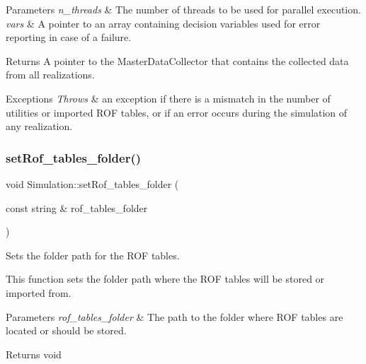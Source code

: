 \begin{DoxyParams}{Parameters}
{\em n\+\_\+threads} & The number of threads to be used for parallel execution. \\
\hline
{\em vars} & A pointer to an array containing decision variables used for error reporting in case of a failure.\\
\hline
\end{DoxyParams}
\begin{DoxyReturn}{Returns}
A pointer to the {\ttfamily Master\+Data\+Collector} that contains the collected data from all realizations.
\end{DoxyReturn}

\begin{DoxyExceptions}{Exceptions}
{\em Throws} & an exception if there is a mismatch in the number of utilities or imported R\+OF tables, or if an error occurs during the simulation of any realization. \\
\hline
\end{DoxyExceptions}
\mbox{\label{classSimulation_a0f01e328435fab79c18ccdda28617bae}} 
\subsubsection{\texorpdfstring{set\+Rof\+\_\+tables\+\_\+folder()}{setRof\_tables\_folder()}}
{\footnotesize\ttfamily void Simulation\+::set\+Rof\+\_\+tables\+\_\+folder (\begin{DoxyParamCaption}\item[{const string \&}]{rof\+\_\+tables\+\_\+folder }\end{DoxyParamCaption})\hspace{0.3cm}{\ttfamily [private]}}



Sets the folder path for the R\+OF tables. 

This function sets the folder path where the R\+OF tables will be stored or imported from.


\begin{DoxyParams}{Parameters}
{\em rof\+\_\+tables\+\_\+folder} & The path to the folder where R\+OF tables are located or should be stored.\\
\hline
\end{DoxyParams}
\begin{DoxyReturn}{Returns}
void 
\end{DoxyReturn}
\mbox{\label{classSimulation_ac9ff965191f13b1ce044344fd1e5d0ac}} 
